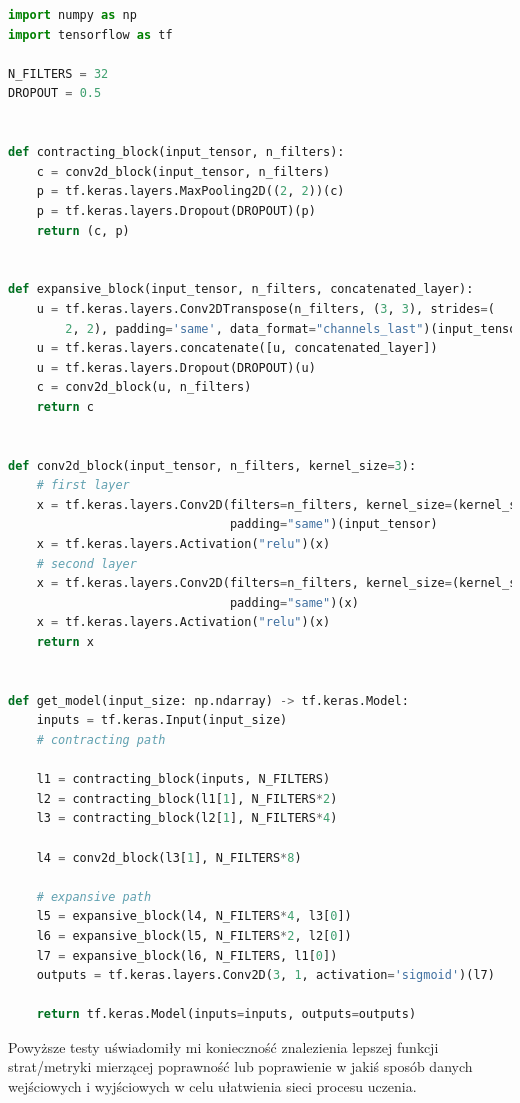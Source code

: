 \documentclass{article}
\begin{document}
\begin{lstlisting}[caption=Moja implementacja architektury U-NET,language=python]
import numpy as np
import tensorflow as tf

N_FILTERS = 32
DROPOUT = 0.5


def contracting_block(input_tensor, n_filters):
    c = conv2d_block(input_tensor, n_filters)
    p = tf.keras.layers.MaxPooling2D((2, 2))(c)
    p = tf.keras.layers.Dropout(DROPOUT)(p)
    return (c, p)


def expansive_block(input_tensor, n_filters, concatenated_layer):
    u = tf.keras.layers.Conv2DTranspose(n_filters, (3, 3), strides=(
        2, 2), padding='same', data_format="channels_last")(input_tensor)
    u = tf.keras.layers.concatenate([u, concatenated_layer])
    u = tf.keras.layers.Dropout(DROPOUT)(u)
    c = conv2d_block(u, n_filters)
    return c


def conv2d_block(input_tensor, n_filters, kernel_size=3):
    # first layer
    x = tf.keras.layers.Conv2D(filters=n_filters, kernel_size=(kernel_size, kernel_size), kernel_initializer="he_normal", data_format="channels_last",
                               padding="same")(input_tensor)
    x = tf.keras.layers.Activation("relu")(x)
    # second layer
    x = tf.keras.layers.Conv2D(filters=n_filters, kernel_size=(kernel_size, kernel_size), kernel_initializer="he_normal", data_format="channels_last",
                               padding="same")(x)
    x = tf.keras.layers.Activation("relu")(x)
    return x


def get_model(input_size: np.ndarray) -> tf.keras.Model:
    inputs = tf.keras.Input(input_size)
    # contracting path

    l1 = contracting_block(inputs, N_FILTERS)
    l2 = contracting_block(l1[1], N_FILTERS*2)
    l3 = contracting_block(l2[1], N_FILTERS*4)

    l4 = conv2d_block(l3[1], N_FILTERS*8)

    # expansive path
    l5 = expansive_block(l4, N_FILTERS*4, l3[0])
    l6 = expansive_block(l5, N_FILTERS*2, l2[0])
    l7 = expansive_block(l6, N_FILTERS, l1[0])
    outputs = tf.keras.layers.Conv2D(3, 1, activation='sigmoid')(l7)

    return tf.keras.Model(inputs=inputs, outputs=outputs)
\end{lstlisting}


Powyższe testy uświadomiły mi konieczność znalezienia lepszej funkcji strat/metryki mierzącej poprawność lub poprawienie w jakiś sposób danych wejściowych i wyjściowych w celu ułatwienia sieci procesu uczenia.
\end{document}
